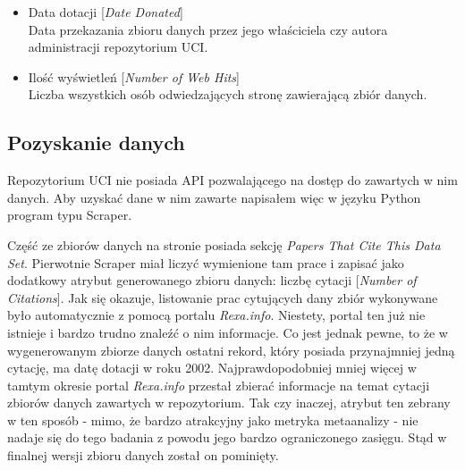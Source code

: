 \begin{itemize}
  \item Data dotacji [\emph{Date Donated}] \\
        Data przekazania zbioru danych przez jego właściciela czy autora administracji repozytorium UCI.

  \item Ilość wyświetleń [\emph{Number of Web Hits}] \\
        Liczba wszystkich osób odwiedzających stronę zawierającą zbiór danych.

\end{itemize}

\subsection{Pozyskanie danych}

Repozytorium UCI nie posiada API pozwalającego na dostęp do zawartych w nim danych.
Aby uzyskać dane w nim zawarte napisałem więc w języku Python program typu Scraper.

Część ze zbiorów danych na stronie posiada sekcję \emph{Papers That Cite This Data Set}.
Pierwotnie Scraper miał liczyć wymienione tam prace i zapisać jako dodatkowy atrybut generowanego zbioru danych: liczbę cytacji [\emph{Number of Citations}].
Jak się okazuje, listowanie prac cytujących dany zbiór wykonywane było automatycznie z pomocą portalu \emph{Rexa.info}.
Niestety, portal ten już nie istnieje i bardzo trudno znaleźć o nim informacje.
Co jest jednak pewne, to że w wygenerowanym zbiorze danych ostatni rekord, który posiada przynajmniej jedną cytację, ma datę dotacji w roku 2002.
Najprawdopodobniej mniej więcej w tamtym okresie portal \emph{Rexa.info} przestał zbierać informacje na temat cytacji zbiorów danych zawartych w repozytorium.
Tak czy inaczej, atrybut ten zebrany w ten sposób - mimo, że bardzo atrakcyjny jako metryka metaanalizy - nie nadaje się do tego badania z powodu jego bardzo ograniczonego zasięgu.
Stąd w finalnej wersji zbioru danych został on pominięty.

